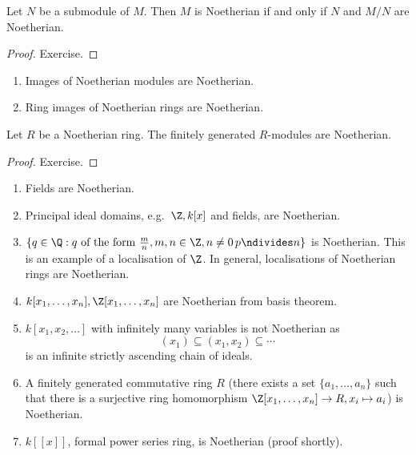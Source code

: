 \documentclass[a4paper]{article}
\begin{document}
\begin{lemma}
  Let \(N\) be a submodule of \(M\). Then \(M\) is Noetherian if and only if \(N\) and \(M/N\) are Noetherian.
\end{lemma}

\begin{proof}
  Exercise.
\end{proof}

\begin{remark}\leavevmode
  \begin{enumerate}
  \item Images of Noetherian modules are Noetherian.
  \item Ring images of Noetherian rings are Noetherian.
  \end{enumerate}
\end{remark}

\begin{lemma}
  Let \(R\) be a Noetherian ring. The finitely generated \(R\)-modules are Noetherian.
\end{lemma}

\begin{proof}
  Exercise.
\end{proof}

\begin{eg}\leavevmode
  \begin{enumerate}
  \item Fields are Noetherian.
  \item Principal ideal domains, e.g.\ \(\Z, k[x]\) and fields, are Noetherian.
  \item \(\{q \in \Q: q \text{ of the form } \frac{m}{n}, m, n \in \Z, n \neq 0\, p \ndivides n\}\) is Noetherian. This is an example of a localisation of \(\Z\). In general, localisations of Noetherian rings are Noetherian.
  \item \(k[x_1, \dots, x_n], \Z[x_1, \dots, x_n]\) are Noetherian from basis theorem.
  \item \(k[x_1, x_2, \dots]\) with infinitely many variables is not Noetherian as
    \[
      (x_1) \subseteq (x_1, x_2) \subseteq \cdots
    \]
    is an infinite strictly ascending chain of ideals.
  \item A finitely generated commutative ring \(R\) (there exists a set \(\{a_1, \dots, a_n\}\) such that there is a surjective ring homomorphism \(\Z[x_1, \dots, x_n] \to R, x_i \mapsto a_i\)) is Noetherian.
  \item \(k[[x]]\), formal power series ring, is Noetherian (proof shortly).
  \end{enumerate}
\end{eg}
\end{document}
